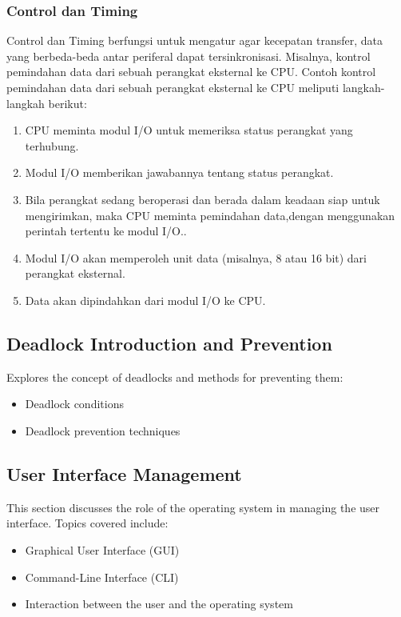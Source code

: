\documentclass[12pt]{article}
\begin{document}
\subsubsection{Control dan Timing}
\newline Control dan Timing berfungsi untuk mengatur agar kecepatan transfer, data yang berbeda-beda antar periferal dapat tersinkronisasi. Misalnya, kontrol pemindahan data dari sebuah perangkat eksternal ke CPU. Contoh kontrol pemindahan data dari sebuah perangkat eksternal ke CPU meliputi langkah-langkah berikut:
\begin{enumerate}
    \item CPU meminta modul I/O untuk memeriksa status perangkat yang terhubung.
    \item Modul I/O memberikan jawabannya tentang status perangkat.
    \item Bila perangkat sedang beroperasi dan berada dalam keadaan siap untuk mengirimkan, maka CPU meminta pemindahan data,dengan menggunakan perintah tertentu ke modul I/O..
    \item Modul I/O akan memperoleh unit data (misalnya, 8 atau 16 bit) dari perangkat eksternal.
    \item Data akan dipindahkan dari modul I/O ke CPU.
\end{enumerate}

\subsection{Deadlock Introduction and Prevention}
Explores the concept of deadlocks and methods for preventing them:
\begin{itemize}
    \item Deadlock conditions
    \item Deadlock prevention techniques
\end{itemize}

\subsection{User Interface Management}
This section discusses the role of the operating system in managing the user interface. Topics covered include:
\begin{itemize}
    \item Graphical User Interface (GUI)
    \item Command-Line Interface (CLI)
    \item Interaction between the user and the operating system
\end{itemize}
\end{document}
